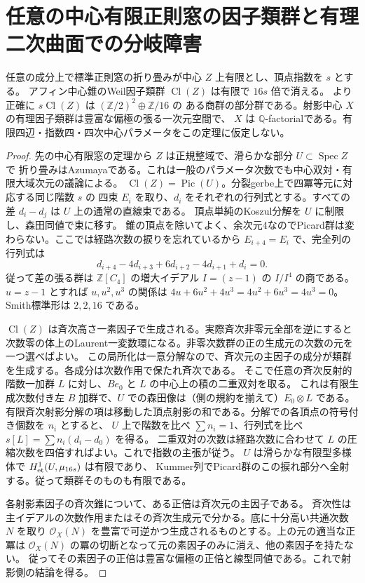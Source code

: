\section{任意の中心有限正則窓の因子類群と有理二次曲面での分岐障害}
\label{sec:finite-center-divisor-torsion}
\begin{theorem}\label{thm:finite-center-divisor-torsion}
任意の成分上で標準正則窓の折り畳みが中心 $Z$ 上有限とし、頂点指数を $s$ とする。
アフィン中心錐のWeil因子類群 $\operatorname{Cl}(Z)$ は有限で $16s$ 倍で消える。
より正確に $s\operatorname{Cl}(Z)$ は $(\mathbb Z/2)^2\oplus\mathbb Z/16$ の
ある商群の部分群である。射影中心 $X$ の有理因子類群は豊富な偏極の張る一次元空間で、
$X$ は $\mathbb Q$-factorialである。有限四辺・指数四・四次中心パラメータをこの定理に仮定しない。
\end{theorem}
\begin{proof}
先の中心有限窓の定理から $Z$ は正規整域で、滑らかな部分 $U\subset\operatorname{Spec} Z$ で
折り畳みはAzumayaである。これは一般のパラメータ次数でも中心双対・有限大域次元の議論による。
$\operatorname{Cl}(Z)=\operatorname{Pic}(U)$。分裂gerbe上で四冪等元に対応する同じ階数 $s$ の
四束 $E_i$ を取り、$d_i$ をそれぞれの行列式とする。すべての差 $d_i-d_j$ は $U$ 上の通常の直線束である。
頂点単純のKoszul分解を $U$ に制限し、森田同値で束に移す。
錐の頂点を除いてよく、余次元4なのでPicard群は変わらない。ここでは経路次数の捩りを忘れているから
$E_{i+4}=E_i$ で、完全列の行列式は
\[
      d_{i+4}-4d_{i+3}+6d_{i+2}-4d_{i+1}+d_i=0.
\]
従って差の張る群は $\mathbb Z[C_4]$ の増大イデアル $I=(z-1)$ の $I/I^4$ の商である。
$u=z-1$ とすれば $u,u^2,u^3$ の関係は $4u+6u^2+4u^3=4u^2+6u^3=4u^3=0$。
Smith標準形は $2,2,16$ である。

$\operatorname{Cl}(Z)$ は斉次高さ一素因子で生成される。実際斉次非零元全部を逆にすると
次数零の体上のLaurent一変数環になる。非零次数群の正の生成元の次数の元を一つ選べばよい。
この局所化は一意分解なので、斉次元の主因子の成分が類群を生成する。各成分は次数作用で保たれ斉次である。
そこで任意の斉次反射的階数一加群 $L$ に対し、$Be_0$ と $L$ の中心上の積の二重双対を取る。
これは有限生成次数付き左 $B$ 加群で、$U$ での森田像は（側の規約を揃えて）$E_0\otimes L$ である。
有限斉次射影分解の項は移動した頂点射影の和である。分解での各頂点の符号付き個数を $n_i$ とすると、
$U$ 上で階数を比べ $\sum n_i=1$、行列式を比べ $s[L]=\sum n_i(d_i-d_0)$ を得る。
二重双対の次数は経路次数に合わせて $L$ の圧縮次数を四倍すればよい。これで指数の主張が従う。
$U$ は滑らかな有限型多様体で $H^1_{\rm et}(U,\mu_{16s})$ は有限であり、
Kummer列でPicard群のこの捩れ部分へ全射する。従って類群そのものも有限である。

各射影素因子の斉次錐について、ある正倍は斉次元の主因子である。
斉次性は主イデアルの次数作用またはその斉次生成元で分かる。底に十分高い共通次数 $N$ を取り
$\mathcal O_X(N)$ を豊富で可逆かつ生成されるものとする。上の元の適当な正冪は
$\mathcal O_X(N)$ の冪の切断となって元の素因子のみに消え、他の素因子を持たない。
従ってその素因子の正倍は豊富な偏極の正倍と線型同値である。これで射影側の結論を得る。
\end{proof}

